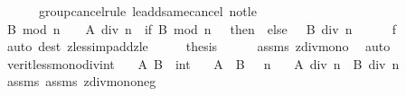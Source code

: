 \begin{isabellebody}
\ \ \ \ \ \ group{\isacharunderscore}{\kern0pt}cancel{\isachardot}{\kern0pt}rule{}\ le{\isacharunderscore}{\kern0pt}add{\isacharunderscore}{\kern0pt}same{\isacharunderscore}{\kern0pt}cancel{}\ not{\isacharunderscore}{\kern0pt}le{\isacharparenright}{\kern0pt}\isanewline
\ \ \isamarkupfalse%
\ \isamarkupfalse%
\ {\isachardoublequoteopen}B\ mod\ n\ {\isacharequal}{\kern0pt}\ {}\ {\isasymlongrightarrow}\ A\ div\ n\ {\isacharplus}{\kern0pt}\ {\isacharparenleft}{\kern0pt}if\ B\ mod\ n\ {\isacharequal}{\kern0pt}\ {}\ then\ {}\ else\ {}{\isacharparenright}{\kern0pt}\ {\isasymle}\ B\ div\ n{\isachardoublequoteclose}\isanewline
\ \ \ \ \isamarkupfalse%
\ f{}\ \isamarkupfalse%
\ {\isacharparenleft}{\kern0pt}auto\ dest{\isacharcolon}{\kern0pt}\ zless{\isacharunderscore}{\kern0pt}imp{\isacharunderscore}{\kern0pt}add{}{\isacharunderscore}{\kern0pt}zle{\isacharparenright}{\kern0pt}\isanewline
\ \ \isamarkupfalse%
\ \isamarkupfalse%
\ {\isacharquery}{\kern0pt}thesis\isanewline
\ \ \ \ \isamarkupfalse%
\ assms\ zdiv{\isacharunderscore}{\kern0pt}mono{}\ \isamarkupfalse%
\ auto\isanewline
{}\isamarkupfalse%
%
\endisatagproof
{\isafoldproof}%
%
\isadelimproof
\isanewline
%
\endisadelimproof
\isanewline
\isanewline
{}\isamarkupfalse%
\ verit{\isacharunderscore}{\kern0pt}less{\isacharunderscore}{\kern0pt}mono{\isacharunderscore}{\kern0pt}div{\isacharunderscore}{\kern0pt}int{}{\isacharcolon}{\kern0pt}\isanewline
\ \ \ A\ B\ {\isacharcolon}{\kern0pt}{\isacharcolon}{\kern0pt}\ int\isanewline
\ \ \ {\isachardoublequoteopen}A\ {\isasymle}\ B{\isachardoublequoteclose}\ {\isachardoublequoteopen}{}\ {\isacharless}{\kern0pt}\ {\isacharminus}{\kern0pt}n{\isachardoublequoteclose}\isanewline
\ \ \ {\isachardoublequoteopen}{\isacharparenleft}{\kern0pt}A\ div\ n{\isacharparenright}{\kern0pt}\ {\isasymge}\ {\isacharparenleft}{\kern0pt}B\ div\ n{\isacharparenright}{\kern0pt}{\isachardoublequoteclose}\isanewline
%
\isadelimproof
\ \ %
\endisadelimproof
%
\isatagproof
{}\isamarkupfalse%
\ assms{\isacharparenleft}{\kern0pt}{}{\isacharparenright}{\kern0pt}\ assms{\isacharparenleft}{\kern0pt}{}{\isacharparenright}{\kern0pt}\ zdiv{\isacharunderscore}{\kern0pt}mono{}{\isacharunderscore}{\kern0pt}neg\ \isamarkupfalse%

\end{isabellebody}
